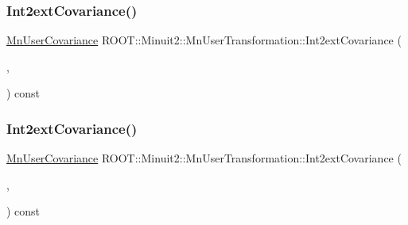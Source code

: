 \subsubsection{\texorpdfstring{Int2extCovariance()}{Int2extCovariance()}\hspace{0.1cm}{\footnotesize\ttfamily [1/3]}}
{\footnotesize\ttfamily \mbox{\hyperlink{classROOT_1_1Minuit2_1_1MnUserCovariance}{Mn\+User\+Covariance}} R\+O\+O\+T\+::\+Minuit2\+::\+Mn\+User\+Transformation\+::\+Int2ext\+Covariance (\begin{DoxyParamCaption}\item[{const \mbox{\hyperlink{namespaceROOT_1_1Minuit2_a62ed97730a1ca8d3fbaec64a19aa11c9}{Mn\+Algebraic\+Vector}} \&}]{,  }\item[{const \mbox{\hyperlink{namespaceROOT_1_1Minuit2_a9e74ad97f5537a2e80e52b04d98ecc6e}{Mn\+Algebraic\+Sym\+Matrix}} \&}]{ }\end{DoxyParamCaption}) const}

\mbox{\label{classROOT_1_1Minuit2_1_1MnUserTransformation_a10f2146be0a2c991243dd2f70a943a15}} 
\subsubsection{\texorpdfstring{Int2extCovariance()}{Int2extCovariance()}\hspace{0.1cm}{\footnotesize\ttfamily [2/3]}}
{\footnotesize\ttfamily \mbox{\hyperlink{classROOT_1_1Minuit2_1_1MnUserCovariance}{Mn\+User\+Covariance}} R\+O\+O\+T\+::\+Minuit2\+::\+Mn\+User\+Transformation\+::\+Int2ext\+Covariance (\begin{DoxyParamCaption}\item[{const \mbox{\hyperlink{namespaceROOT_1_1Minuit2_a62ed97730a1ca8d3fbaec64a19aa11c9}{Mn\+Algebraic\+Vector}} \&}]{,  }\item[{const \mbox{\hyperlink{namespaceROOT_1_1Minuit2_a9e74ad97f5537a2e80e52b04d98ecc6e}{Mn\+Algebraic\+Sym\+Matrix}} \&}]{ }\end{DoxyParamCaption}) const}

\mbox{\label{classROOT_1_1Minuit2_1_1MnUserTransformation_a10f2146be0a2c991243dd2f70a943a15}} 
